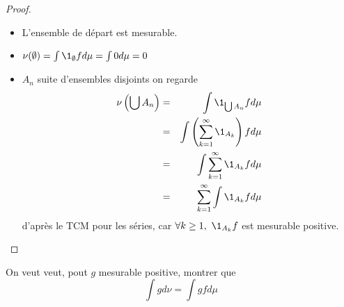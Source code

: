\begin{proof}
	\begin{itemize}
		\item L'ensemble de départ est mesurable.
		\item $\nu(\emptyset) = \int \1_{\emptyset} f d\mu = \int 0 d \mu = 0$
		\item $A_n$ suite d'ensembles disjoints on regarde
		      \begin{eqnarray*}
			      \nu\left(\bigcup A_n\right) &=& \int \1_{\bigcup A_n} f d\mu \\
			      &=& \int \left( \sum_{k=1}^{\infty} \1_{A_k} \right) f d\mu \\
			      &=& \int \sum_{k=1}^{\infty} \1_{A_k} f d\mu \\
			      &=& \sum_{k=1}^{\infty} \int \1_{A_k} f d\mu
		      \end{eqnarray*}
		      d'après le TCM pour les séries, car $\forall k \geq 1, \ \1_{A_k}f$ est mesurable positive.
	\end{itemize}
\end{proof}

\begin{remarque} \label{rem:transfert}
	On veut veut, pout $g$ mesurable positive, montrer que
	$$ \int g d\nu = \int g f d\mu $$
\end{remarque}

